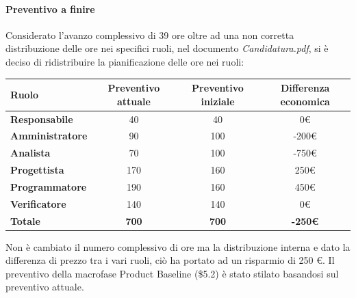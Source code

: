 \paragraph{Preventivo a finire} \hfill \break
Considerato l'avanzo complessivo di 39 ore oltre ad una non corretta distribuzione delle ore nei specifici ruoli, nel documento \emph{Candidatura.pdf}, si è deciso di ridistribuire la pianificazione delle ore nei ruoli:
\begin{center}
	\renewcommand{\arraystretch}{1.8}
	\begin{tabular}{ | l |c|c|c| }
    \hline
    \textbf{Ruolo} & \textbf{Preventivo attuale} & \textbf{Preventivo iniziale}  & \textbf{Differenza economica}\\
	\hline
    \textbf{Responsabile} & 40 & 40 & 0\euro \\
    \hline
    \textbf{Amministratore} & 90 & 100 & -200\euro \\
    \hline
    \textbf{Analista} & 70 & 100 & -750\euro \\
    \hline
    \textbf{Progettista} & 170 & 160 & 250\euro \\
    \hline
    \textbf{Programmatore} & 190 & 160 & 450\euro \\
    \hline
    \textbf{Verificatore} & 140 & 140 & 0\euro \\
    \hline
    \textbf{Totale} & \textbf{700} & \textbf{700} & \textbf{-250\euro} \\
    \hline
    \end{tabular}
\end{center}
Non è cambiato il numero complessivo di ore ma la distribuzione interna e dato la differenza di prezzo tra i vari ruoli, ciò ha portato ad un risparmio di 250 \euro. \newline
Il preventivo della macrofase Product Baseline (\$5.2) è stato stilato basandosi sul preventivo attuale.